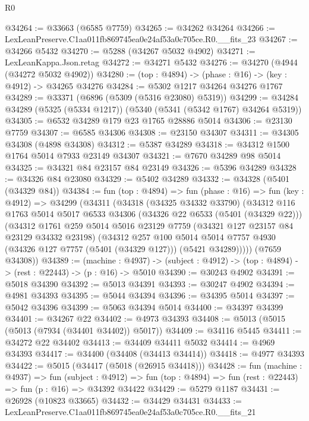 \begin{lexlean}{R0}
\begin{coremodule}
@34264 := @33663 (@6585 @7759)
@34265 := @34262 @34264
@34266 := LexLeanPreserve.C1aa011fb869745ea0e24af53a0c705ce.R0.__fits_23
@34267 := @34266 @5432
@34270 := @5288 (@34267 @5032 @4902)
@34271 := LexLeanKappa.Json.retag
@34272 := @34271 @5432
@34276 := @34270 (@4944 (@34272 @5032 @4902))
@34280 := (top : @4894) -> (phase : @16) -> (key : @4912) -> @34265 @34276
@34284 := @5302 @1217 @34264 @34276 @1767
@34289 := @33371 (@6896 (@5309 (@5316 @23080) @5319))
@34299 := @34284 @34289 (@5325 (@5334 @1217)) (@5340 (@5341 (@5342 @1767) @34264 @5319))
@34305 := @6532 @34289 @179 @23 @1765 @28886 @5014
@34306 := @23130 @7759
@34307 := @6585 @34306
@34308 := @23150 @34307
@34311 := @34305 @34308 (@4898 @34308)
@34312 := @5387 @34289
@34318 := @34312 @1500 @1764 @5014 @7933 @23149 @34307
@34321 := @7670 @34289 @98 @5014
@34325 := @34321 @84 @23157 @84 @23149
@34326 := @5396 @34289
@34328 := @34326 @84 @23080
@34329 := @5402 @34289
@34332 := @34328 (@5401 (@34329 @84))
@34384 := fun (top : @4894) =>
  fun (phase : @16) =>
  fun (key : @4912) =>
  @34299
    (@34311
      (@34318
        (@34325 @34332 @33790)
        (@34312
          @116
          @1763
          @5014
          @5017
          @6533
          @34306
          (@34326 @22 @6533 (@5401 (@34329 @22)))
          (@34312
            @1761
            @259
            @5014
            @5016
            @23129
            @7759
            (@34321 @127 @23157 @84 @23129 @34332 @23198)
            (@34312
              @257
              @100
              @5014
              @5014
              @7757
              @4930
              (@34326 @127 @7757 (@5401 (@34329 @127)))
              (@5421 @34289)))))
      (@7659 @34308))
@34389 := (machine : @4937) ->
  (subject : @4912) -> (top : @4894) -> (rest : @22443) -> (p : @16) -> @5010
@34390 := @30243 @4902
@34391 := @5018 @34390
@34392 := @5013 @34391
@34393 := @30247 @4902
@34394 := @4981 @34393
@34395 := @5044 @34394
@34396 := @34395 @5014
@34397 := @5042 @34396
@34399 := @5063 @34394 @5014
@34400 := @34397 @34399
@34401 := @34267 @22
@34402 := @4973 @34393
@34408 := @5013 (@5015 (@5013 (@7934 (@34401 @34402)) @5017))
@34409 := @34116 @5445
@34411 := @34272 @22 @34402
@34413 := @34409 @34411 @5032
@34414 := @4969 @34393
@34417 := @34400 (@34408 (@34413 @34414))
@34418 := @4977 @34393
@34422 := @5015 (@34417 (@5018 (@26915 @34418)))
@34428 := fun (machine : @4937) =>
  fun (subject : @4912) =>
  fun (top : @4894) => fun (rest : @22443) => fun (p : @16) => @34392 @34422
@34429 := @5279 @1187
@34431 := @26928 (@10823 @33665)
@34432 := @34429 @34431
@34433 := LexLeanPreserve.C1aa011fb869745ea0e24af53a0c705ce.R0.__fits_21

\end{coremodule}
\end{lexlean}
